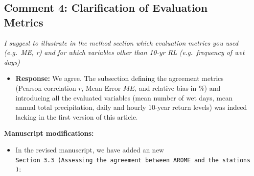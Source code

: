 \documentclass[
  letterpaper,
  DIV=11,
  numbers=noendperiod]{scrartcl}
\providecommand{\tightlist}{%
  \setlength{\itemsep}{0pt}\setlength{\parskip}{0pt}}\usepackage{longtable,booktabs,array}
\begin{document}
\subsection{Comment 4: Clarification of Evaluation
Metrics}\label{comment-4-clarification-of-evaluation-metrics}

\emph{I suggest to illustrate in the method section which evaluation
metrics you used (e.g.~ME, r) and for which variables other than 10-yr
RL (e.g.~frequency of wet days)}

\begin{itemize}
\tightlist
\item
  \textbf{Response:} We agree. The subsection defining the agreement
  metrics (Pearson correlation \(r\), Mean Error \(ME\), and relative
  bias in \%) and introducing all the evaluated variables (mean number
  of wet days, mean annual total precipitation, daily and hourly 10-year
  return levels) was indeed lacking in the first version of this
  article.
\end{itemize}

\textbf{Manuscript modifications:}

\begin{itemize}
\tightlist
\item
  In the revised manuscript, we have added an new
  \texttt{Section\ 3.3\ (Assessing\ the\ agreement\ between\ AROME\ and\ the\ stations)}:
\end{itemize}
\end{document}

